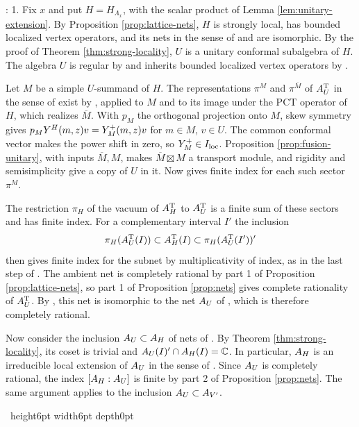 \documentclass[leqno]{article}
\newcommand{\Cbb}{\ensuremath{\mathbb{C}}}
\let\cal\relax
\newcommand{\cal}{\mathcal}
\newcommand{\qed}{\hfill \vrule height6pt  width6pt depth0pt}
\newcommand{\ovl}{\overline}
\newenvironment{proof}[1][]{\noindent {\it Proof #1} : }{\hbox{~}\qed
\smallskip
}
\numberwithin{equation}{section}
\begin{document}
\begin{proof}
1. Fix $x$ and put $H=H_{\Lambda_x}$, with the scalar product of Lemma \ref{lem:unitary-extension}. By Proposition \ref{prop:lattice-nets}, $H$ is strongly local, has bounded localized vertex operators, and its nets in the sense of \cite{Ten19a} and \cite{CKLW18} are isomorphic. By the proof of Theorem \ref{thm:strong-locality}, $U$ is a unitary conformal subalgebra of $H$. The algebra $U$ is regular by \cite[Theorem 4.5]{ABD04} and inherits bounded localized vertex operators by \cite[Proposition 4.16]{Ten19a}.

Let $M$ be a simple $U$-summand of $H$. The representations $\pi^M$ and $\pi^{\ovl M}$ of $\cal A_U^{\mathrm T}$ in the sense of \cite[Definition 2.18]{Ten24} exist by \cite[Theorem 5.6 and Lemma 5.7]{Ten19a}, applied to $M$ and to its image under the PCT operator of $H$, which realizes $\ovl M$. With $p_M$ the orthogonal projection onto $M$, skew symmetry gives $p_MY^H(m,z)v=\cal Y_M^+(m,z)v$ for $m\in M$, $v\in U$. The common conformal vector makes the power shift in \cite[Theorem 5.15]{Ten19a} zero, so $\cal Y_M^+\in\cal I_{\mathrm{loc}}$. Proposition \ref{prop:fusion-unitary}, with inputs $\ovl M,M$, makes $\ovl M\boxtimes M$ a transport module, and rigidity and semisimplicity give a copy of $U$ in it. Now \cite[Theorem 4.19]{Ten24} gives finite index for each such sector $\pi^M$.

The restriction $\pi_H$ of the vacuum of $\cal A_H^{\mathrm T}$ to $\cal A_U^{\mathrm T}$ is a finite sum of these sectors and has finite index. For a complementary interval $I'$ the inclusion
\[
\pi_H(\cal A_U^{\mathrm T}(I))
 \subset \cal A_H^{\mathrm T}(I)
 \subset \pi_H(\cal A_U^{\mathrm T}(I'))'
\]
then gives finite index for the subnet by multiplicativity of index, as in the last step of \cite[Corollary 4.24]{Ten24}. The ambient net is completely rational by part 1 of Proposition \ref{prop:lattice-nets}, so part 1 of Proposition \ref{prop:nets} gives complete rationality of $\cal A_U^{\mathrm T}$. By \cite[Lemma 7.6 p.~72]{Ten19a}, this net is isomorphic to the net $\cal A_U$ of \cite{CKLW18}, which is therefore completely rational.

Now consider the inclusion $\cal A_U \subset \cal A_H$ of nets of \cite{CKLW18}. By Theorem \ref{thm:strong-locality}, its coset is trivial and $\cal A_U(I)' \cap \cal A_H(I) = \Cbb$. In particular, $\cal A_H$ is an irreducible local extension of $\cal A_U$ in the sense of \cite[p.~9]{KL04}. Since $\cal A_U$ is completely rational, the index $[\cal A_H : \cal A_U]$ is finite by part 2 of Proposition \ref{prop:nets}. The same argument applies to the inclusion $\cal A_U \subset \cal A_{V'}$.


\end{proof}
\end{document}

